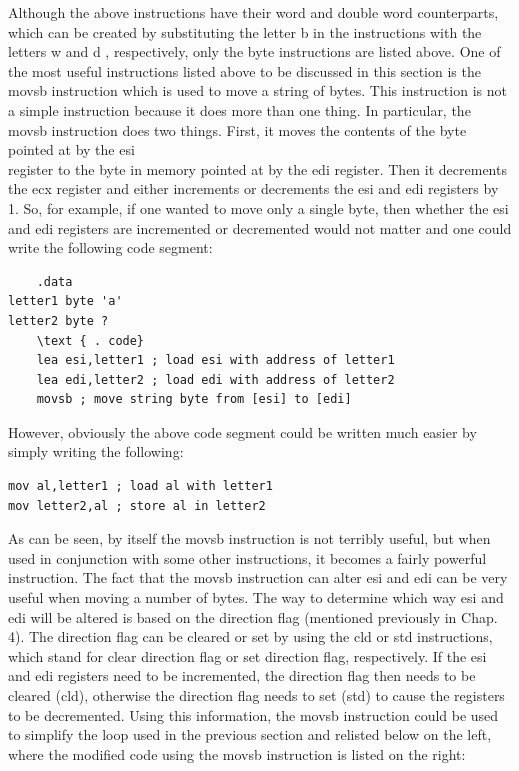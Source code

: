\documentclass[10pt]{article}
\begin{document}
Although the above instructions have their word and double word counterparts, which can be created by substituting the letter b in the instructions with the letters w and d , respectively, only the byte instructions are listed above. One of the most useful instructions listed above to be discussed in this section is the movsb instruction which is used to move a string of bytes. This instruction is not a simple instruction because it does more than one thing. In particular, the movsb instruction does two things. First, it moves the contents of the byte pointed at by the esi\\
register to the byte in memory pointed at by the edi register. Then it decrements the ecx register and either increments or decrements the esi and edi registers by 1. So, for example, if one wanted to move only a single byte, then whether the esi and edi registers are incremented or decremented would not matter and one could write the following code segment:

\begin{verbatim}
    .data
letter1 byte 'a'
letter2 byte ?
    \text { . code}
    lea esi,letter1 ; load esi with address of letter1
    lea edi,letter2 ; load edi with address of letter2
    movsb ; move string byte from [esi] to [edi]
\end{verbatim}

However, obviously the above code segment could be written much easier by simply writing the following:

\begin{verbatim}
mov al,letter1 ; load al with letter1
mov letter2,al ; store al in letter2
\end{verbatim}

As can be seen, by itself the movsb instruction is not terribly useful, but when used in conjunction with some other instructions, it becomes a fairly powerful instruction. The fact that the movsb instruction can alter esi and edi can be very useful when moving a number of bytes. The way to determine which way esi and edi will be altered is based on the direction flag (mentioned previously in Chap. 4). The direction flag can be cleared or set by using the cld or std instructions, which stand for clear direction flag or set direction flag, respectively. If the esi and edi registers need to be incremented, the direction flag then needs to be cleared (cld), otherwise the direction flag needs to set (std) to cause the registers to be decremented. Using this information, the movsb instruction could be used to simplify the loop used in the previous section and relisted below on the left, where the modified code using the movsb instruction is listed on the right:
\end{document}

